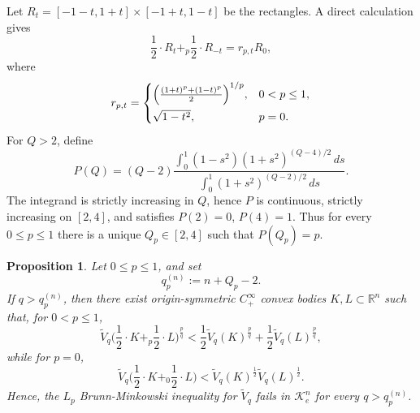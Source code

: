 \documentclass[12pt,leqno]{amsart}
\theoremstyle{plain} \newtheorem{thm}{Theorem}[section]
\theoremstyle{plain} \newtheorem{prop}[thm]{Proposition}
\theoremstyle{plain} \newtheorem{prob}[thm]{Problem}
\theoremstyle{definition} \newtheorem{defi}[thm]{Definition}
\theoremstyle{plain} \newtheorem{cor}[thm]{Corollary}
\theoremstyle{plain} \newtheorem{lem}[thm]{Lemma}
\theoremstyle{plain} \newtheorem{eg}{Example}[section]
\theoremstyle{remark} \newtheorem{rmk}[thm]{Remark}
\theoremstyle{plain} \newtheorem{conj}{Conjecture}
\numberwithin{equation}{section}
\newcommand{\tV}{\widetilde V}
\newcommand{\R}{\mathbb{R}}
\begin{document}
Let \(R_t=[-1-t,1+t]\times[-1+t,1-t]\) be the rectangles. A direct calculation gives
\[
\frac{1}{2}\cdot R_t+_p\frac{1}{2}\cdot R_{-t}=r_{p,t}R_0,
\]
where
\[
r_{p,t}
=
\begin{cases}
\Bigl(\frac{(1+t)^p+(1-t)^p}{2}\Bigr)^{1/p}, & 0<p\le1,\\[2mm]
\sqrt{1-t^2}, & p=0.
\end{cases}
\]
For \(Q>2\), define
\[
P(Q)
=
(Q-2)\frac{\displaystyle\int_0^1(1-s^2)(1+s^2)^{(Q-4)/2}\,ds}
{\displaystyle\int_0^1(1+s^2)^{(Q-2)/2}\,ds}.
\]
The integrand is strictly increasing in \(Q\), hence \(P\) is continuous, strictly increasing on \([2,4]\), and satisfies \(P(2)=0\), \(P(4)=1\). Thus for every \(0\le p\le1\) there is a unique \(Q_p\in[2,4]\) such that \(P(Q_p)=p\).

\begin{prop}\label{prop-Lp-fail-threshold}
Let \(0\le p\le1\), and set
\[
q_p^{(n)}:=n+Q_p-2.
\]
If \(q>q_p^{(n)}\), then there exist origin-symmetric \(C^\infty_+\) convex bodies
\(K,L\subset\R^n\) such that, for \(0<p\le1\),
\[
\tV_q\bigl(\frac{1}{2}\cdot K+_p\frac{1}{2}\cdot L\bigr)^{\frac{p}{q}}
<
\frac12\tV_q(K)^{\frac{p}{q}}
+\frac12\tV_q(L)^{\frac{p}{q}},
\]
while for \(p=0\),
\[
\tV_q\bigl(\frac{1}{2}\cdot K+_0\frac{1}{2}\cdot L\bigr)
<
\tV_q(K)^{\frac12}\tV_q(L)^{\frac12}.
\]
Hence, the \(L_p\) Brunn-Minkowski inequality for \(\tV_q\) fails in
\(\mathcal{K}_e^n\) for every \(q>q_p^{(n)}\).
\end{prop}
\end{document}
